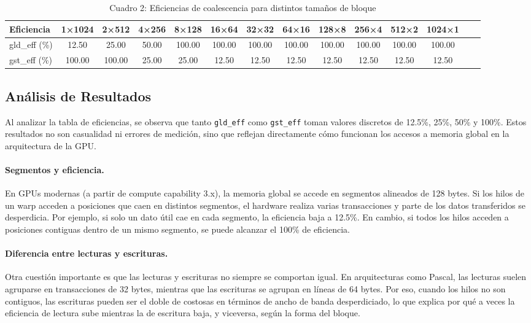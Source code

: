 \documentclass[a4paper,11pt]{article}
\begin{document}
\begin{table}[H]
  \centering
  \caption{Cuadro 2: Eficiencias de coalescencia para distintos tamaños de bloque}
  \small
  \setlength{\tabcolsep}{1.5pt}
  \begin{tabular}{l*{13}{S}}
    \toprule
    \textbf{Eficiencia} & \textbf{1×1024} & \textbf{2×512} & \textbf{4×256} & \textbf{8×128} & \textbf{16×64} & \textbf{32×32} & \textbf{64×16} & \textbf{128×8} & \textbf{256×4} & \textbf{512×2} & \textbf{1024×1} \\
    \midrule
    gld\_eff (\%) & 12.50 & 25.00 & 50.00 & 100.00 & 100.00 & 100.00 & 100.00 & 100.00 & 100.00 & 100.00 & 100.00 \\
    gst\_eff (\%) & 100.00 & 100.00 & 25.00 & 25.00 & 12.50 & 12.50 & 12.50 & 12.50 & 12.50 & 12.50 & 12.50 \\
    \bottomrule
  \end{tabular}
\end{table}


\subsection{Análisis de Resultados}

Al analizar la tabla de eficiencias, se observa que tanto \texttt{gld\_eff} como \texttt{gst\_eff} toman valores discretos de 12.5\%, 25\%, 50\% y 100\%. Estos resultados no son casualidad ni errores de medición, sino que reflejan directamente cómo funcionan los accesos a memoria global en la arquitectura de la GPU.

\paragraph{Segmentos y eficiencia.}
En GPUs modernas (a partir de compute capability 3.x), la memoria global se accede en segmentos alineados de 128 bytes. Si los hilos de un warp acceden a posiciones que caen en distintos segmentos, el hardware realiza varias transacciones y parte de los datos transferidos se desperdicia. Por ejemplo, si solo un dato útil cae en cada segmento, la eficiencia baja a 12.5\%. En cambio, si todos los hilos acceden a posiciones contiguas dentro de un mismo segmento, se puede alcanzar el 100\% de eficiencia.

\paragraph{Diferencia entre lecturas y escrituras.}
Otra cuestión importante es que las lecturas y escrituras no siempre se comportan igual. En arquitecturas como Pascal, las lecturas suelen agruparse en transacciones de 32 bytes, mientras que las escrituras se agrupan en líneas de 64 bytes. Por eso, cuando los hilos no son contiguos, las escrituras pueden ser el doble de costosas en términos de ancho de banda desperdiciado, lo que explica por qué a veces la eficiencia de lectura sube mientras la de escritura baja, y viceversa, según la forma del bloque.
\end{document}
